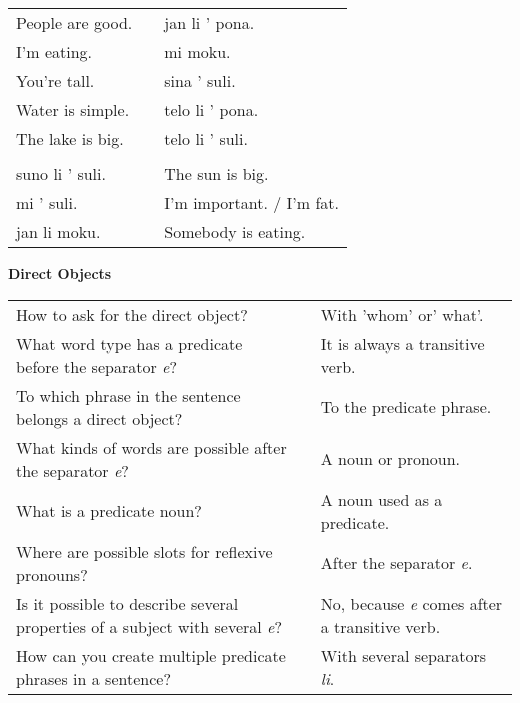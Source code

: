 \begin{supertabular}{p{5,5cm}|ll}
People are good. && jan li ' pona. \\ %
I'm eating. && mi moku. \\ %
You're tall. && sina ' suli. \\ %
Water is simple. && telo li ' pona. \\ %
The lake is big. && telo li ' suli. \\ %
 && \\ %
suno li ' suli. && The sun is big. \\
mi ' suli. && I'm important. / I'm fat. \\
jan li moku. && Somebody is eating. \\
\end{supertabular} 

\textbf{Direct Objects} 
\label{'direct_objects_compund_sentences'}

\begin{supertabular}{p{5,5cm}|ll}
How to ask for the direct object? && With 'whom' or' what'. \\ %
What word type has a predicate before the separator \textit{e}?  && It is always a transitive verb. \\ %
To which phrase in the sentence belongs a direct object? && To the predicate phrase. \\ %
What kinds of words are possible after the separator \textit{e}?  && A noun or pronoun. \\ %
What is a predicate noun?  && A noun used as a predicate. \\ %
Where are possible slots for reflexive pronouns? && After the separator \textit{e}. \\ %
Is it possible to describe several properties of a subject with several \textit{e}? && No, because \textit{e} comes after a transitive verb. \\ %
How can you create multiple predicate phrases in a sentence?  && With several separators \textit{li}. \\ %
\end{supertabular} 

